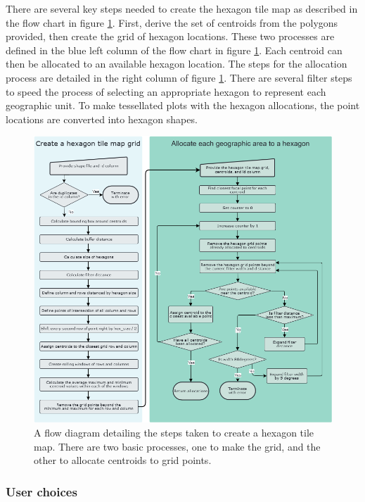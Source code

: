 There are several key steps needed to create the hexagon tile map as
described in the flow chart in figure \ref{fig:sugarbag_flow}. First,
derive the set of centroids from the polygons provided, then create the
grid of hexagon locations. These two processes are defined in the blue
left column of the flow chart in figure \ref{fig:sugarbag_flow}. Each
centroid can then be allocated to an available hexagon location. The
steps for the allocation process are detailed in the right column of
figure \ref{fig:sugarbag_flow}. There are several filter steps to speed
the process of selecting an appropriate hexagon to represent each
geographic unit. To make tessellated plots with the hexagon allocations,
the point locations are converted into hexagon shapes.

\begin{figure}
\includegraphics[width=14cm]{figs/sugarbag flow.png}
\caption{\label{fig:sugarbag_flow}A flow diagram detailing the steps taken to create a hexagon tile map. There are two basic processes, one to make the grid, and the other to allocate centroids to grid points.}
\end{figure}

\hypertarget{user-choices}{%
\subsubsection{User choices}\label{user-choices}}


